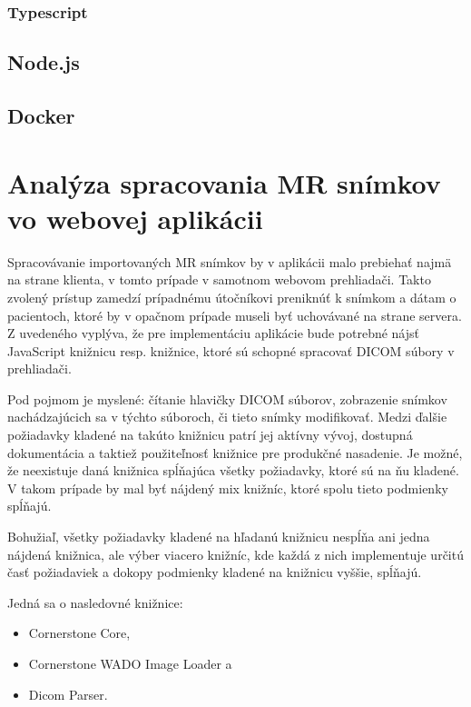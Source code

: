 \subsubsection {Typescript}

\subsection {Node.js}

\subsection {Docker}

\section {Analýza spracovania MR snímkov vo webovej aplikácii}
Spracovávanie importovaných MR snímkov by v aplikácii malo prebiehať najmä na strane klienta, v tomto prípade v samotnom webovom prehliadači. Takto zvolený prístup zamedzí prípadnému útočníkovi preniknúť k snímkom a dátam o pacientoch, ktoré by v opačnom prípade museli byť uchovávané na strane servera. Z uvedeného vyplýva, že pre implementáciu aplikácie bude potrebné nájsť JavaScript knižnicu resp. knižnice, ktoré sú schopné spracovať DICOM súbory v prehliadači. 

Pod pojmom  je myslené: čítanie hlavičky DICOM súborov, zobrazenie snímkov nachádzajúcich sa v týchto súboroch, či tieto snímky modifikovať. Medzi ďalšie požiadavky kladené na takúto knižnicu patrí jej aktívny vývoj, dostupná dokumentácia a taktiež použiteľnosť knižnice pre produkčné nasadenie. Je možné, že neexistuje daná knižnica spĺňajúca všetky požiadavky, ktoré sú na ňu kladené. V takom prípade by mal byť nájdený mix knižníc, ktoré spolu tieto podmienky spĺňajú.

Bohužiaľ, všetky požiadavky kladené na hľadanú knižnicu nespĺňa ani jedna nájdená knižnica, ale výber viacero knižníc, kde každá z nich implementuje určitú časť požiadaviek a dokopy podmienky kladené na knižnicu vyššie, spĺňajú.

Jedná sa o nasledovné knižnice:
\begin {itemize}
\item {Cornerstone Core,}
\item {Cornerstone WADO Image Loader a}
\item {Dicom Parser.}
\end {itemize}


